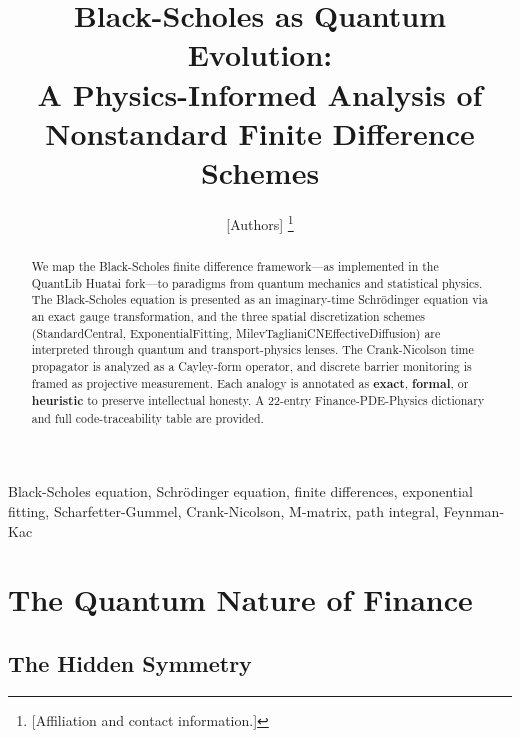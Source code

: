 
\title{Black-Scholes as Quantum Evolution:\\A Physics-Informed Analysis of Nonstandard Finite Difference Schemes}

\author{[Authors]%
\thanks{[Affiliation and contact information.]}
}

\maketitle

\begin{abstract}
We map the Black-Scholes finite difference framework---as implemented in the QuantLib Huatai fork---to paradigms from quantum mechanics and statistical physics.  The Black-Scholes equation is presented as an imaginary-time Schr\"{o}dinger equation via an exact gauge transformation, and the three spatial discretization schemes (StandardCentral, ExponentialFitting, MilevTaglianiCNEffectiveDiffusion) are interpreted through quantum and transport-physics lenses.  The Crank-Nicolson time propagator is analyzed as a Cayley-form operator, and discrete barrier monitoring is framed as projective measurement.  Each analogy is annotated as \textbf{exact}, \textbf{formal}, or \textbf{heuristic} to preserve intellectual honesty.  A 22-entry Finance-PDE-Physics dictionary and full code-traceability table are provided.
\end{abstract}

\begin{IEEEkeywords}
Black-Scholes equation, Schr\"{o}dinger equation, finite differences, exponential fitting, Scharfetter-Gummel, Crank-Nicolson, M-matrix, path integral, Feynman-Kac
\end{IEEEkeywords}

\section{The Quantum Nature of Finance}
\label{sec:quantum-nature}

\subsection{The Hidden Symmetry}

